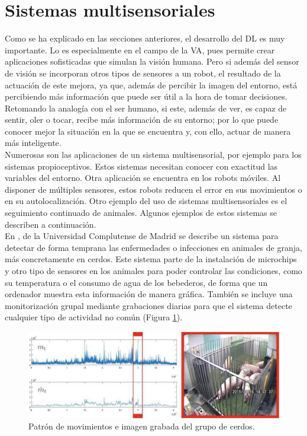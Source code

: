 \section{Sistemas multisensoriales}
Como se ha explicado en las secciones anteriores, el desarrollo del DL es muy importante. Lo es especialmente en el campo de la VA, pues permite crear aplicaciones sofisticadas que simulan la visión humana. Pero si además del sensor de visión se incorporan otros tipos de sensores a un robot, el resultado de la actuación de este mejora, ya que, además de percibir la imagen del entorno, está percibiendo más información que puede ser útil a la hora de tomar decisiones. Retomando la analogía con el ser humano, si este, además de ver, es capaz de sentir, oler o tocar, recibe más información de su entorno; por lo que puede conocer mejor la situación en la que se encuentra y, con ello, actuar de manera más inteligente.\\

Numerosas son las aplicaciones de un sistema multisensorial, por ejemplo para los sistemas propioceptivos. Estos sistemas necesitan conocer con exactitud las variables del entorno. Otra aplicación se encuentra en los robots móviles. Al disponer de múltiples sensores, estos robots reducen el error en sus movimientos o en su autolocalización. Otro ejemplo del uso de sistemas multisensoriales es el seguimiento continuado de animales. Algunos ejemplos de estos sistemas se describen a continuación.\\

En \cite{ucm}, de la Universidad Complutense de Madrid se describe un sistema para detectar de forma temprana las enfermedades o infecciones en animales de granja, más concretamente en cerdos. Este sistema parte de la instalación de microchips y otro tipo de sensores en los animales para poder controlar las condiciones, como su temperatura o el consumo de agua de los bebederos, de forma que un ordenador muestra esta información de manera gráfica. También se incluye una monitorización grupal mediante grabaciones diarias para que el sistema detecte cualquier tipo de actividad no común (Figura \ref{fig:ucm}).\\
\begin{figure} [h!]
  \begin{center}
    \includegraphics[width=14cm]{figs/ucm}
  \end{center}
  \caption{Patrón de movimientos e imagen grabada del grupo de cerdos.}
  \label{fig:ucm}
\end{figure}

